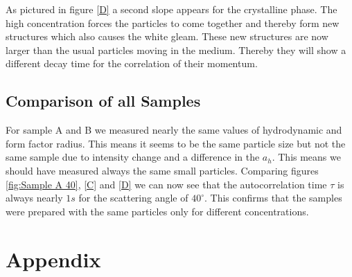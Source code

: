 \documentclass[]{article}
\begin{document}
As pictured in figure \ref{D} a second slope appears for the crystalline phase. The high concentration forces the particles to come together and thereby form new structures which also causes the white gleam. These new structures are now larger than the usual particles moving in the medium. Thereby they will show a different decay time for the correlation of their momentum.

\subsection{Comparison of all Samples}
For sample A and B we measured nearly the same values of hydrodynamic and form factor radius. This means it seems to be the same particle size but not the same sample due to intensity change and a difference in the $a_h$. This means we should have measured always the same small particles. Comparing figures \ref{fig:Sample A 40}, \ref{C} and \ref{D} we can now see that the autocorrelation time $\tau$ is always nearly $1s$ for the scattering angle of $40^\circ$. This confirms that the samples were prepared with the same particles only for different concentrations.


\newpage
\section{Appendix}
\end{document}
